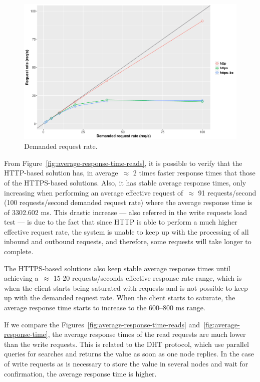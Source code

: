 \begin{figure}[h!]
  \centering
  \includegraphics[scale=0.4]{Figures/evaluation/request-rate-reads-linear-new.pdf}
  \caption{Demanded request rate.}
  \label{fig:demanded-request-rate-reads}
\end{figure}

From Figure~\ref{fig:average-response-time-reads}, it is possible to verify that the HTTP-based solution has, in average~$\approx$ 2 times faster response times that those of the HTTPS-based solutions.
Also, it has stable average response times, only increasing when performing an average effective request of~$\approx$ 91 requests/second (100 requests/second demanded request rate) where the average response time is of 3302.602 ms.
This drastic increase — also referred in the write requests load test — is due to the fact that since HTTP is able to perform a much higher effective request rate, the system is unable to keep up with the processing of all inbound and outbound requests, and therefore, some requests will take longer to complete.

The HTTPS-based solutions also keep stable average response times until achieving a~$\approx$ 15-20 requests/seconds effective response rate range, which is when the client starts being saturated with requests and is not possible to keep up with the demanded request rate.
When the client starts to saturate, the average response time starts to increase to the 600–800 ms range.

If we compare the Figures~\ref{fig:average-response-time-reads} and~\ref{fig:average-response-time}, the average response times of the read requests are much lower than the write requests.
This is related to the DHT protocol, which use parallel queries for searches and returns the value as soon as one node replies.
In the case of write requests as is necessary to store the value in several nodes and wait for confirmation, the average response time is higher.

